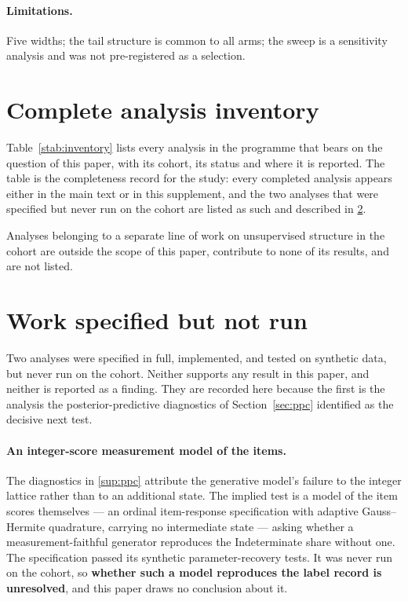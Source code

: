 \paragraph{Limitations.} Five widths; the tail structure is common to all arms;
the sweep is a sensitivity analysis and was not pre-registered as a selection.

\section{Complete analysis inventory}
\label{sup:inventory}

Table~\ref{stab:inventory} lists every analysis in the programme that bears on the
question of this paper, with its cohort, its status and where it is reported. The
table is the completeness record for the study: every completed analysis appears
either in the main text or in this supplement, and the two analyses that were
specified but never run on the cohort are listed as such and described in
\ref{sup:notrun}.

Analyses belonging to a separate line of work on unsupervised structure in the
cohort are outside the scope of this paper, contribute to none of its results,
and are not listed.

\begin{small}

\end{small}
\label{stab:inventory}

\section{Work specified but not run}
\label{sup:notrun}

Two analyses were specified in full, implemented, and tested on synthetic data,
but never run on the cohort. Neither supports any result in this paper, and
neither is reported as a finding. They are recorded here because the first is the
analysis the posterior-predictive diagnostics of Section~\ref{sec:ppc} identified
as the decisive next test.

\paragraph{An integer-score measurement model of the items.} The diagnostics in
\ref{sup:ppc} attribute the generative model's failure to the integer lattice
rather than to an additional state. The implied test is a model of the item scores
themselves --- an ordinal item-response specification with adaptive
Gauss--Hermite quadrature, carrying no intermediate state --- asking whether a
measurement-faithful generator reproduces the Indeterminate share without one.
The specification passed its synthetic parameter-recovery tests. It was never run
on the cohort, so \textbf{whether such a model reproduces the label record is
unresolved}, and this paper draws no conclusion about it.

